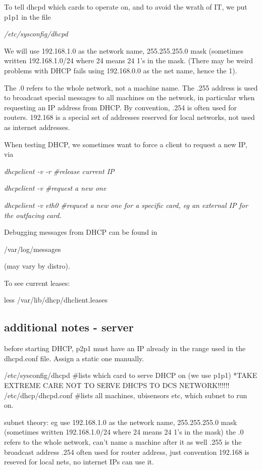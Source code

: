 \documentclass[oneside,english]{scrbook}
\begin{document}
To tell dhcpd which cards to operate on, and to avoid the wrath of
IT, we put p1p1 in the file

\emph{/etc/sysconfig/dhcpd}

We will use 192.168.1.0 as the network name, 255.255.255.0 mask (sometimes
written 192.168.1.0/24 where 24 means 24 1's in the mask. (There may
be weird problems with DHCP fails using 192.168.0.0 as the net name,
hence the 1).

The .0 refers to the whole network, not a machine name. The .255 address
is used to broadcast special messages to all machines on the network,
in particular when requesting an IP address from DHCP. By convention,
.254 is often used for routers. 192.168 is a special set of addresses
reserved for local networks, not used as internet addresses.

When testing DHCP, we sometimes want to force a client to request
a new IP, via

\emph{dhcpclient -v -r \#release current IP}

\emph{dhcpclient -v \#request a new one}

\emph{dhcpclient -v eth0 \#request a new one for a specific card,
eg an external IP for the outfacing card.}

Debugging messages from DHCP can be found in

/var/log/messages

(may vary by distro).

To see current leases:

less /var/lib/dhcp/dhclient.leases

\subsection{additional notes - server}

before starting DHCP, p2p1 must have an IP already in the range used in the dhcpd.conf file.  Assign a static one manually.

/etc/sysconfig/dhcpd #lists which card to serve DHCP on (we use p1p1)   *TAKE EXTREME CARE NOT TO SERVE DHCPS TO DCS NETWORK!!!!!!
/etc/dhcp/dhcpd.conf   #lists all machines, ubisensors etc, which subnet to run on.

subnet theory:
    eg use 192.168.1.0 as the network name, 255.255.255.0 mask    (sometimes written 192.168.1.0/24 where 24 means 24 1's in the mask)
    the .0 refers to the whole network, can't name a machine after it as well
    .255 is the broadcast address
    .254 often used for router address, just convention
    192.168 is reseved for local nets, no internet IPs can use it.
\end{document}
